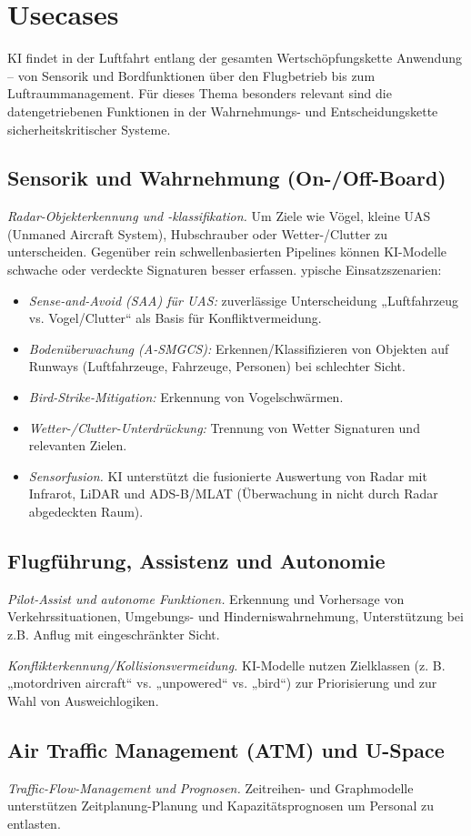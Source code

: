 \section{Usecases}
KI findet in der Luftfahrt entlang der gesamten Wertschöpfungskette Anwendung – von Sensorik und Bordfunktionen 
über den Flugbetrieb bis zum Luftraummanagement. Für dieses Thema besonders relevant sind die datengetriebenen 
Funktionen in der Wahrnehmungs- und Entscheidungs­kette sicherheitskritischer Systeme.
\subsection{Sensorik und Wahrnehmung (On-/Off-Board)}
\textit{Radar-Objekterkennung und -klassifikation.} 
Um Ziele wie Vögel, kleine UAS (Unmaned Aircraft System), Hubschrauber oder Wetter-/Clutter zu unterscheiden. Gegenüber rein schwellenbasierten 
Pipelines können KI-Modelle schwache oder verdeckte Signaturen besser erfassen.
ypische Einsatzszenarien:
\begin{itemize}
  \item \textit{Sense-and-Avoid (SAA) für UAS:} zuverlässige Unterscheidung „Luftfahrzeug vs. Vogel/Clutter“ als Basis für Konfliktvermeidung.
  \item \textit{Bodenüberwachung (A-SMGCS):} Erkennen/Klassifizieren von Objekten auf Runways (Luftfahrzeuge, Fahrzeuge, Personen) bei schlechter Sicht.
  \item \textit{Bird-Strike-Mitigation:} Erkennung von Vogelschwärmen.
  \item \textit{Wetter-/Clutter-Unterdrückung:} Trennung von Wetter Signaturen und relevanten Zielen.
  \item \textit{Sensorfusion.} KI unterstützt die fusionierte Auswertung von Radar mit Infrarot, LiDAR und ADS-B/MLAT (Überwachung in nicht durch Radar abgedeckten Raum). 
\end{itemize}
\subsection{Flugführung, Assistenz und Autonomie}
\textit{Pilot-Assist und autonome Funktionen.}
Erkennung und Vorhersage von Verkehrssituationen, Umgebungs- und Hinderniswahrnehmung, 
Unterstützung bei z.B. Anflug mit eingeschränkter Sicht.

\textit{Konflikterkennung/Kollisionsvermeidung.} 
KI-Modelle nutzen Zielklassen (z. B. „motordriven aircraft“ vs. „unpowered“ vs. „bird“) zur Priorisierung und zur Wahl von Ausweichlogiken.
\subsection{Air Traffic Management (ATM) und U-Space}
\textit{Traffic-Flow-Management und Prognosen.} 
Zeitreihen- und Graphmodelle unterstützen Zeitplanung-Planung und Kapazitätsprognosen um Personal zu entlasten.

